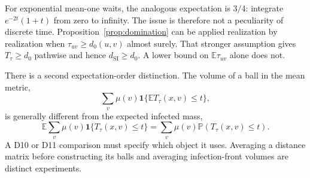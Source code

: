 \documentclass[11pt,letterpaper]{article}
\theoremstyle{definition}
\theoremstyle{remark}
\newcommand{\E}{\mathbb E}
\newcommand{\Prob}{\mathbb P}
\newcommand{\one}{\mathbf 1}
\newcommand{\dSI}{d_{\mathrm{SI}}}
\begin{document}
For exponential mean-one waits, the analogous expectation is $3/4$: integrate $e^{-2t}(1+t)$ from zero to infinity. The issue is therefore not a peculiarity of discrete time. Proposition~\ref{prop:domination} can be applied realization by realization when $\tau_{uv}\geq d_0(u,v)$ almost surely. That stronger assumption gives $T_\tau\geq d_0$ pathwise and hence $\dSI\geq d_0$. A lower bound on $\E\tau_{uv}$ alone does not.

There is a second expectation-order distinction. The volume of a ball in the mean metric,
\begin{equation}
 \sum_v\mu(v)\one\{\E T_\tau(x,v)\leq t\},
\end{equation}
is generally different from the expected infected mass,
\begin{equation}
 \E\sum_v\mu(v)\one\{T_\tau(x,v)\leq t\}
 =\sum_v\mu(v)\Prob(T_\tau(x,v)\leq t).
 \label{eq:infectedmass}
\end{equation}
A D10 or D11 comparison must specify which object it uses. Averaging a distance matrix before constructing its balls and averaging infection-front volumes are distinct experiments.
\end{document}
